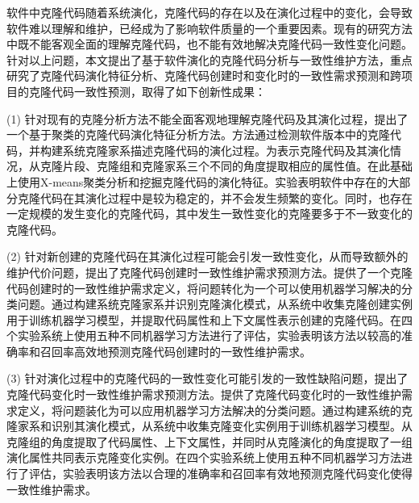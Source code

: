 



软件中克隆代码随着系统演化，克隆代码的存在以及在演化过程中的变化，会导致软件难以理解和维护，已经成为了影响软件质量的一个重要因素。现有的研究方法中既不能客观全面的理解克隆代码，也不能有效地解决克隆代码一致性变化问题。针对以上问题，本文提出了基于软件演化的克隆代码分析与一致性维护方法，重点研究了克隆代码演化特征分析、克隆代码创建时和变化时的一致性需求预测和跨项目的克隆代码一致性预测，取得了如下创新性成果：

(1) 针对现有的克隆分析方法不能全面客观地理解克隆代码及其演化过程，提出了一个基于聚类的克隆代码演化特征分析方法。方法通过检测软件版本中的克隆代码，并构建系统克隆家系描述克隆代码的演化过程。为表示克隆代码及其演化情况，从克隆片段、克隆组和克隆家系三个不同的角度提取相应的属性值。在此基础上使用X-means聚类分析和挖掘克隆代码的演化特征。实验表明软件中存在的大部分克隆代码在其演化过程中是较为稳定的，并不会发生频繁的变化。同时，也存在一定规模的发生变化的克隆代码，其中发生一致性变化的克隆要多于不一致变化的克隆代码。

(2) 针对新创建的克隆代码在其演化过程可能会引发一致性变化，从而导致额外的维护代价问题，提出了克隆代码创建时一致性维护需求预测方法。提供了一个克隆代码创建时的一致性维护需求定义，将问题转化为一个可以使用机器学习解决的分类问题。通过构建系统克隆家系并识别克隆演化模式，从系统中收集克隆创建实例用于训练机器学习模型，并提取代码属性和上下文属性表示创建的克隆代码。在四个实验系统上使用五种不同机器学习方法进行了评估，实验表明该方法以较高的准确率和召回率高效地预测克隆代码创建时的一致性维护需求。

(3) 针对演化过程中的克隆代码的一致性变化可能引发的一致性缺陷问题，提出了克隆代码变化时一致性维护需求预测方法。提供了克隆代码变化时的一致性维护需求定义，将问题装化为可以应用机器学习方法解决的分类问题。通过构建系统的克隆家系和识别其演化模式，从系统中收集克隆变化实例用于训练机器学习模型。从克隆组的角度提取了代码属性、上下文属性，并同时从克隆演化的角度提取了一组演化属性共同表示克隆变化实例。在四个实验系统上使用五种不同机器学习方法进行了评估，实验表明该方法以合理的准确率和召回率有效地预测克隆代码变化使得一致性维护需求。

